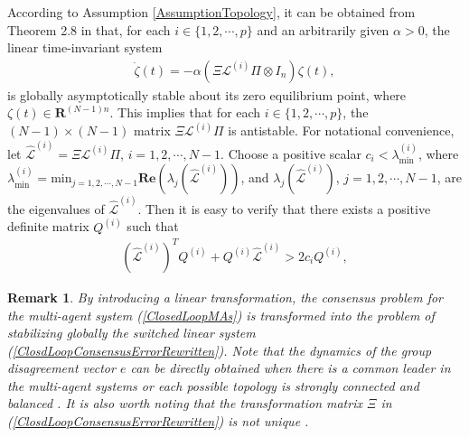 \documentclass[letterpaper, 10 pt, conference]{ieeeconf}
\newtheorem{remark}{Remark}
\begin{document}
According to Assumption \ref{AssumptionTopology}, it can be
obtained from Theorem 2.8 in \cite{RenBeard2008Book} that, for each $i\in
\{1,2,\cdots,p\}$ and an arbitrarily given $\alpha>0$, the linear
time-invariant system
\begin{eqnarray}
\dot{\zeta}(t)=-\alpha\left(\Xi\mathcal{L}^{(i)}\Pi \otimes I_{n}\right)\zeta(t),
\end{eqnarray}
is globally asymptotically stable about its zero equilibrium point, where
$\zeta(t)\in \mathbf{R}^{(N-1)n}$. This implies that for each
$i\in \{1,2,\cdots,p\}$, the $(N-1)\times (N-1)$ matrix
$\Xi\mathcal{L}^{(i)}\Pi$ is antistable. For notational convenience, let
$\widehat{\mathcal{L}}^{(i)}=\Xi\mathcal{L}^{(i)}\Pi$,
$i=1,2,\cdots,N-1$. Choose a positive scalar
$c_{i}<\lambda_{\mathrm{min}}^{(i)}$, where  $\lambda_{\mathrm{min}}^{(i)}=\mathrm{min}_{j=1,2,\cdots,N-1}\mathbf{Re}(\lambda_{j}(\widehat{\mathcal{L}}^{(i)}))$, and
$\lambda_{j}(\widehat{\mathcal{L}}^{(i)})$, $j=1,2,\cdots, N-1$, are the
eigenvalues of $\widehat{\mathcal{L}}^{(i)}$.
Then it is easy to verify that there
exists a positive definite matrix $Q^{(i)}$ such that
\begin{eqnarray}\label{LMILaplacianMatrix}
\left(\widehat{\mathcal{L}}^{(i)}\right)^{T}Q^{(i)}+Q^{(i)}\widehat{\mathcal{L}}^{(i)}>2c_{i} Q^{(i)},
\end{eqnarray}
\par
\begin{remark}
By introducing a linear transformation, the
  consensus problem for the multi-agent system
(\ref{ClosedLoopMAs}) is transformed into the
problem of stabilizing globally
the switched linear system
(\ref{ClosdLoopConsensusErrorRewritten}). Note that the dynamics of the group
disagreement vector $e$ can be directly obtained when there is a common leader
in the multi-agent systems or each possible topology is strongly connected
and balanced \cite{WenHuYuChenCaoSCL2013,WenYuCaoHuChenASCC2013}. It is
also worth noting that the
transformation matrix $\Xi$ in (\ref{ClosdLoopConsensusErrorRewritten}) is
not unique \cite{WenwuCaoLuSIAM2007,SunWangXieTAC2008}.
\end{remark}
\par
\end{document}
